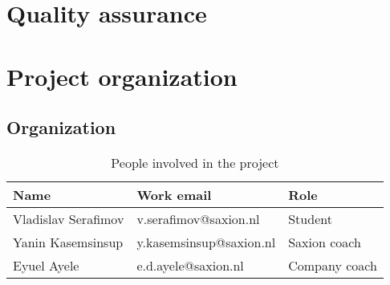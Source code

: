 \documentclass{report}
\begin{document}
	
	
	
	
	\chapter{Quality assurance}\label{quality_assurance}
	
	
	
	
	
	\chapter{Project organization}
	
	\section{Organization}
	
	\begin{table}[h]
		\centering
		\begin{tabular}{|l|l|l|}
			\hline
			Name                & Work email              & Role          \\ \hline
			Vladislav Serafimov & v.serafimov@saxion.nl   & Student       \\ \hline
			Yanin Kasemsinsup   & y.kasemsinsup@saxion.nl & Saxion coach  \\ \hline
			Eyuel Ayele         & e.d.ayele@saxion.nl     & Company coach \\ \hline
		\end{tabular}
		\caption{People involved in the project}
		\label{involved}
	\end{table}
	
\end{document}
